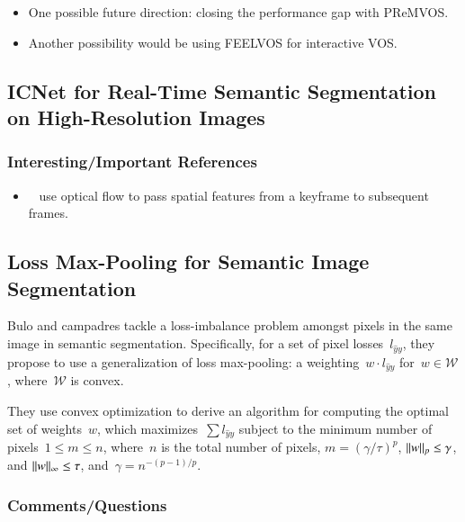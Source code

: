 \documentclass[a4paper, 12pt]{article}
\DeclarePairedDelimiter\norm{\lVert}{\rVert}%
\begin{document}
\begin{itemize}
        \item One possible future direction: closing the performance gap with
                PReMVOS\@.

        \item Another possibility would be using FEELVOS for interactive VOS\@.
\end{itemize}


\subsection{ICNet for Real-Time Semantic Segmentation on High-Resolution
            Images~\cite{zhao2017icnet}}

\subsubsection{Interesting/Important References}

\begin{itemize}
        \item~\cite{zhu17dff} use optical flow to pass spatial features from a
                keyframe to subsequent frames.
\end{itemize}


\subsection{Loss Max-Pooling for Semantic Image Segmentation~\cite{bulo2017loss}}

Bulo and campadres tackle a loss-imbalance problem amongst pixels in the same
image in semantic segmentation. Specifically, for a set of pixel
losses~$l_{\hat{y} y}$, they propose to use a generalization of loss
max-pooling: a weighting~$w \cdot l_{\hat{y} y}$ for~$w \in \mathcal{W}$,
where~$\mathcal{W}$ is convex.

They use convex optimization to derive an algorithm for computing the optimal
set of weights~$w$, which maximizes~$\sum l_{\hat{y} y}$ subject to the minimum
number of pixels~$1 \leq m \leq n$, where~$n$ is the total number of pixels,
$m = {(\gamma / \tau)}^p$, $\norm{w}_p \leq \gamma$, and
$\norm{w}_\infty \leq \tau$, and~$\gamma = n^{-(p - 1)/p}$.


\subsubsection{Comments/Questions}
\end{document}
